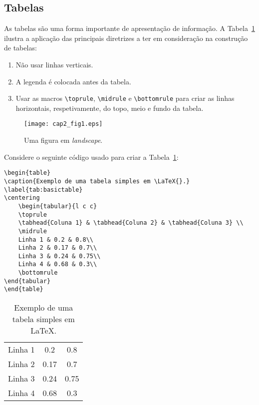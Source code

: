 \subsection{Tabelas}

As tabelas são uma forma importante de apresentação de informação. A Tabela~\ref{tab:basictable} ilustra a aplicação das principais diretrizes a ter em consideração na construção de tabelas:

\begin{enumerate}
   \item Não usar linhas verticais.
   \item A legenda é colocada antes da tabela.
   \item Usar as macros \verb|\toprule|, \verb|\midrule| e \verb|\bottomrule| para criar as linhas horizontais, respetivamente, do topo, meio e fundo da tabela.
\end{enumerate} 

\begin{landscape}
	\begin{figure}[htbp]
		\centering
		\texttt{[image: cap2\_fig1.eps]}
		\caption{Uma figura em \textit{landscape}.}
		\label{fig:exemplo3}
	\end{figure}
\end{landscape}

Considere o seguinte código usado para criar a Tabela~\ref{tab:basictable}:

{\small
\begin{verbatim}
\begin{table}
\caption{Exemplo de uma tabela simples em \LaTeX{}.}
\label{tab:basictable}
\centering
	\begin{tabular}{l c c}
	\toprule
	\tabhead{Coluna 1} & \tabhead{Coluna 2} & \tabhead{Coluna 3} \\
	\midrule
	Linha 1 & 0.2 & 0.8\\
	Linha 2 & 0.17 & 0.7\\
	Linha 3 & 0.24 & 0.75\\
	Linha 4 & 0.68 & 0.3\\
	\bottomrule
\end{tabular}
\end{table}
\end{verbatim}
}

\begin{table}[htb]
	\caption{Exemplo de uma tabela simples em \LaTeX{}.}
	\label{tab:basictable}
	\centering
	\begin{tabular}{l c c}
	\toprule
	\tabhead{Coluna 1} & \tabhead{Coluna 2} & \tabhead{Coluna 3} \\
	\midrule
		Linha 1 & 0.2 & 0.8\\
		Linha 2 & 0.17 & 0.7\\
		Linha 3 & 0.24 & 0.75\\
		Linha 4 & 0.68 & 0.3\\
	\bottomrule
	\end{tabular}
\end{table}

